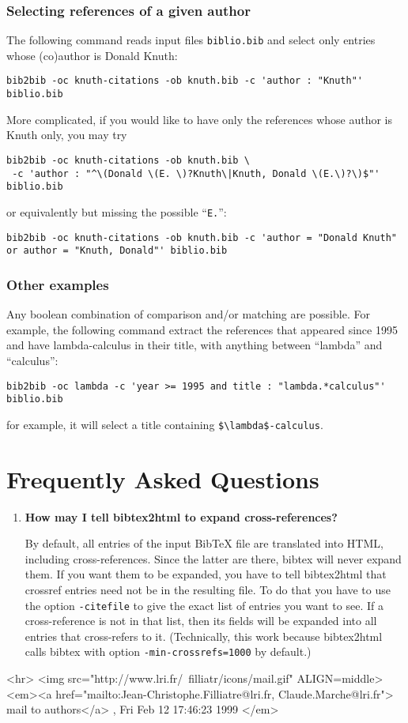 \documentclass[11pt,a4paper]{article}
\begin{document}
\subsubsection{Selecting references of a given author}

The following command reads input files \verb|biblio.bib| and select
only entries whose (co)author is Donald Knuth: 
\begin{verbatim}
bib2bib -oc knuth-citations -ob knuth.bib -c 'author : "Knuth"' biblio.bib
\end{verbatim}
More complicated, if you would like to have only the references whose
author is Knuth only, you may try
\begin{verbatim}
bib2bib -oc knuth-citations -ob knuth.bib \
 -c 'author : "^\(Donald \(E. \)?Knuth\|Knuth, Donald \(E.\)?\)$"' biblio.bib
\end{verbatim}
or equivalently but missing the possible ``\verb|E.|'':
\begin{verbatim}
bib2bib -oc knuth-citations -ob knuth.bib -c 'author = "Donald Knuth"
or author = "Knuth, Donald"' biblio.bib
\end{verbatim}

\subsubsection{Other examples}

Any boolean combination of comparison and/or matching are
possible. For example, the following command extract the references
that appeared since 1995 and have lambda-calculus in their title, with
anything between ``lambda'' and ``calculus'':
\begin{verbatim}
bib2bib -oc lambda -c 'year >= 1995 and title : "lambda.*calculus"' biblio.bib
\end{verbatim}
for example, it will select a title containing
\verb|$\lambda$-calculus|. 
 
\section{Frequently Asked Questions}

\begin{enumerate}

\item \textbf{How may I tell bibtex2html to expand cross-references?} ~

  By default, all entries of the input BibTeX file are translated into
  HTML, including cross-references. Since the latter are there, bibtex
  will never expand them. If you want them to be expanded, you have to
  tell bibtex2html that crossref entries need not be in the resulting
  file. To do that you have to use the option \verb|-citefile| to give
  the exact list of entries you want to see. If a cross-reference is
  not in that list, then its fields will be expanded into all entries
  that cross-refers to it. (Technically, this work because bibtex2html
  calls bibtex with option \verb|-min-crossrefs=1000| by default.)
  
\end{enumerate}

\begin{rawhtml}
<hr>
<img src="http://www.lri.fr/~filliatr/icons/mail.gif" ALIGN=middle>
<em><a href="mailto:Jean-Christophe.Filliatre@lri.fr, Claude.Marche@lri.fr">
mail to authors</a> , Fri Feb 12 17:46:23 1999 
</em>
\end{rawhtml}
\end{document}
